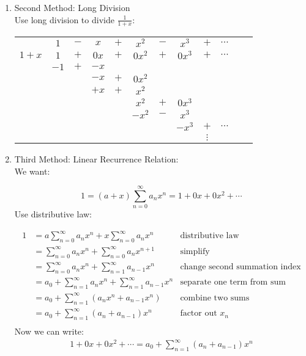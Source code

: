 \begin{example}
\begin{example}
\begin{enumerate}
\item Second Method: Long Division\\

Use long division to divide $\frac{1}{1+x}:$\\ 

\begin{tabular}{cccccccccccc}
&  $1$ & $-$ & $x$ & $+$ & $x^2$ & $-$ & $x^3$ & $+$ & $\cdots$\\ \cline{2-10}

\multicolumn{1}{r|}{$1 + x$}
&  $1$ & $+$ & $0x$ & $+$ & $0x^2$ & $+$ & $0x^3$ & $+$ & $\cdots$\\
& $-1$ & $+$ & $-x$\\ \cline{2-4}
&      &     & $-x$ & $+$ & $0x^2$\\ 
&      &     & $+x$ & $+$ & $x^2$\\ \cline{4-8}
&      &     &      &     & $x^2$ & $+$ & $0x^3$\\ 
&      &     &      &     & $-x^2$ & $-$ & $x^3$\\ \cline{6-8}
&      &     &      &     &       &        & $-x^3$ & $+$ &  $\cdots$\\
&      &     &      &     &       &        &        & $\vdots$\\

\end{tabular}

\item Third Method: Linear Recurrence Relation:\\

We want:

\begin{equation*}{}
1=(a+x)\sum_{n=0}^{\infty}a_nx^n=1+0x+0x^2+\cdots
\end{equation*}
Use distributive law:

\begin{align*}
1&=a\sum_{n=0}^{\infty}a_nx^n+x\sum_{n=0}^{\infty}a_nx^{n}  & \text{distributive law}\\
&=\sum_{n=0}^{\infty}a_nx^n+\sum_{n=0}^{\infty}a_nx^{n+1} & \text{simplify}\\
&=\sum_{n=0}^{\infty}a_nx^n+\sum_{n=1}^{\infty}a_{n-1}x^{n} & \text{change second summation index}\\ 
&=a_0+\sum_{n=1}^{\infty}a_nx^n+\sum_{n=1}^{\infty}a_{n-1}x^{n} & \text{separate one term from sum}\\
&=a_0+\sum_{n=1}^{\infty}(a_nx^n+a_{n-1}x^n) & \text{combine two sums}\\
&=a_0+\sum_{n=1}^{\infty}(a_n+a_{n-1})x^n & \text{factor out $x_n$}\\
\end{align*}
Now we can write:
\begin{align*}
1+0x+0x^2+\cdots=a_0+\sum_{n=1}^{\infty}(a_n+a_{n-1})x^n\\
\end{align*}


\end{enumerate}
\end{example}
\end{example}
